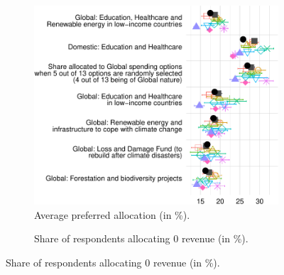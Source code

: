 \documentclass[12pt,english]{article}
\begin{document}
\begin{bibunit}
\begin{figure}[h!]

\begin{subfigure}{.62\textwidth}
    \caption[]{Average preferred allocation (in \%).}
    \includegraphics[height=.38\textheight]{../figures/country_comparison/split_main_means_nolegend.pdf}
    \end{subfigure} 
  \begin{subfigure}{.38\textwidth}
    \caption[]{Share of respondents allocating 0 revenue (in \%).} 

\end{subfigure}
\end{figure}
\end{bibunit}
\end{document}

